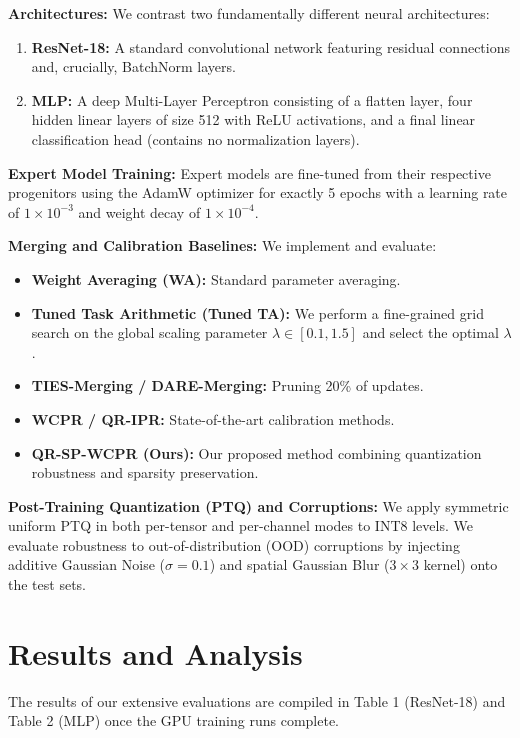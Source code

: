 \documentclass{article}
\theoremstyle{plain}
\theoremstyle{definition}
\theoremstyle{remark}
\begin{document}
\textbf{Architectures:} We contrast two fundamentally different neural architectures:
\begin{enumerate}
    \item \textbf{ResNet-18:} A standard convolutional network featuring residual connections and, crucially, BatchNorm layers.
    \item \textbf{MLP:} A deep Multi-Layer Perceptron consisting of a flatten layer, four hidden linear layers of size 512 with ReLU activations, and a final linear classification head (contains no normalization layers).
\end{enumerate}

\textbf{Expert Model Training:} Expert models are fine-tuned from their respective progenitors using the AdamW optimizer for exactly 5 epochs with a learning rate of $1 \times 10^{-3}$ and weight decay of $1 \times 10^{-4}$.

\textbf{Merging and Calibration Baselines:} We implement and evaluate:
\begin{itemize}
    \item \textbf{Weight Averaging (WA):} Standard parameter averaging.
    \item \textbf{Tuned Task Arithmetic (Tuned TA):} We perform a fine-grained grid search on the global scaling parameter $\lambda \in [0.1, 1.5]$ and select the optimal $\lambda$.
    \item \textbf{TIES-Merging / DARE-Merging:} Pruning 20\% of updates.
    \item \textbf{WCPR / QR-IPR:} State-of-the-art calibration methods.
    \item \textbf{QR-SP-WCPR (Ours):} Our proposed method combining quantization robustness and sparsity preservation.
\end{itemize}

\textbf{Post-Training Quantization (PTQ) and Corruptions:} We apply symmetric uniform PTQ in both per-tensor and per-channel modes to INT8 levels. We evaluate robustness to out-of-distribution (OOD) corruptions by injecting additive Gaussian Noise ($\sigma = 0.1$) and spatial Gaussian Blur ($3 \times 3$ kernel) onto the test sets.

\section{Results and Analysis}
\label{sec:results}

The results of our extensive evaluations are compiled in Table 1 (ResNet-18) and Table 2 (MLP) once the GPU training runs complete.
\end{document}
